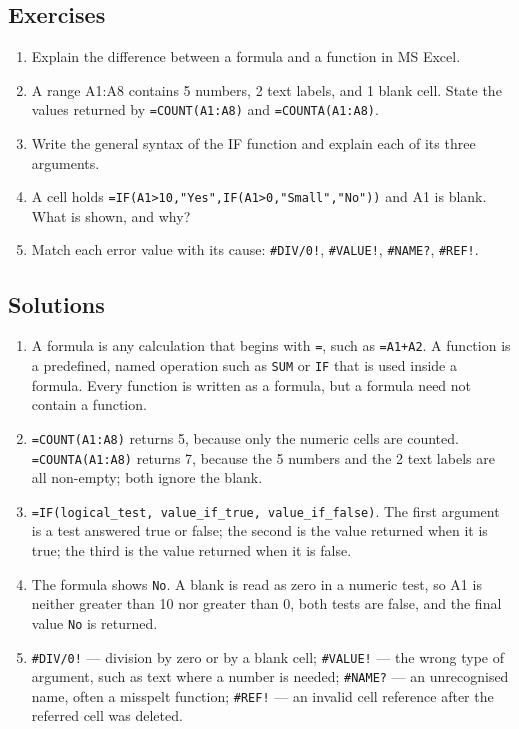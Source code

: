 \subsection*{Exercises}
\begin{enumerate}[label=\arabic*.]
  \item Explain the difference between a formula and a function in MS Excel.
  \item A range A1:A8 contains 5 numbers, 2 text labels, and 1 blank cell.
    State the values returned by \texttt{=COUNT(A1:A8)} and
    \texttt{=COUNTA(A1:A8)}.
  \item Write the general syntax of the IF function and explain each of its
    three arguments.
  \item A cell holds \texttt{=IF(A1>10,"Yes",IF(A1>0,"Small","No"))} and A1 is
    blank. What is shown, and why?
  \item Match each error value with its cause: \texttt{\#DIV/0!},
    \texttt{\#VALUE!}, \texttt{\#NAME?}, \texttt{\#REF!}.
\end{enumerate}

\subsection*{Solutions}
\begingroup\small
\begin{enumerate}[label=\arabic*.]
  \item A formula is any calculation that begins with \texttt{=}, such as
    \texttt{=A1+A2}. A function is a predefined, named operation such as
    \texttt{SUM} or \texttt{IF} that is used inside a formula. Every function
    is written as a formula, but a formula need not contain a function.
  \item \texttt{=COUNT(A1:A8)} returns 5, because only the numeric cells are
    counted. \texttt{=COUNTA(A1:A8)} returns 7, because the 5 numbers and the
    2 text labels are all non-empty; both ignore the blank.
  \item \texttt{=IF(logical\_test, value\_if\_true, value\_if\_false)}. The
    first argument is a test answered true or false; the second is the value
    returned when it is true; the third is the value returned when it is
    false.
  \item The formula shows \texttt{No}. A blank is read as zero in a numeric
    test, so A1 is neither greater than 10 nor greater than 0, both tests are
    false, and the final value \texttt{No} is returned.
  \item \texttt{\#DIV/0!} --- division by zero or by a blank cell;
    \texttt{\#VALUE!} --- the wrong type of argument, such as text where a
    number is needed; \texttt{\#NAME?} --- an unrecognised name, often a
    misspelt function; \texttt{\#REF!} --- an invalid cell reference after
    the referred cell was deleted.
\end{enumerate}
\endgroup


